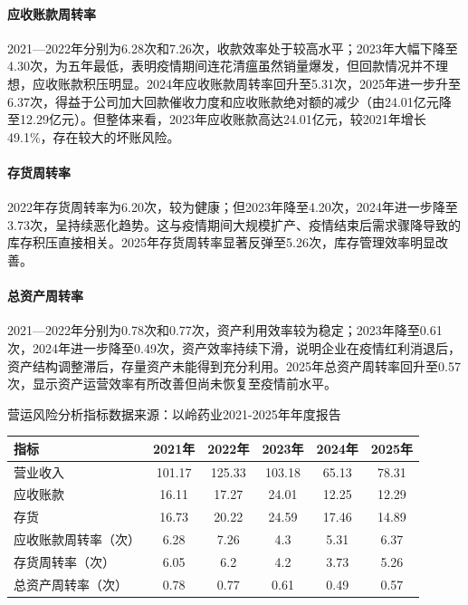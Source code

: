 \documentclass[12pt,a4paper,fontset=windows,UTF8]{ctexart}
\begin{document}
\paragraph*{应收账款周转率}
2021—2022年分别为6.28次和7.26次，收款效率处于较高水平；2023年大幅下降至4.30次，为五年最低，表明疫情期间连花清瘟虽然销量爆发，但回款情况并不理想，应收账款积压明显。2024年应收账款周转率回升至5.31次，2025年进一步升至6.37次，得益于公司加大回款催收力度和应收账款绝对额的减少（由24.01亿元降至12.29亿元）。但整体来看，2023年应收账款高达24.01亿元，较2021年增长49.1\%，存在较大的坏账风险。

\paragraph*{存货周转率}
2022年存货周转率为6.20次，较为健康；但2023年降至4.20次，2024年进一步降至3.73次，呈持续恶化趋势。这与疫情期间大规模扩产、疫情结束后需求骤降导致的库存积压直接相关。2025年存货周转率显著反弹至5.26次，库存管理效率明显改善。

\paragraph*{总资产周转率}
2021—2022年分别为0.78次和0.77次，资产利用效率较为稳定；2023年降至0.61次，2024年进一步降至0.49次，资产效率持续下滑，说明企业在疫情红利消退后，资产结构调整滞后，存量资产未能得到充分利用。2025年总资产周转率回升至0.57次，显示资产运营效率有所改善但尚未恢复至疫情前水平。

\begin{thesTab}[htbp]{营运风险分析指标\label{tab:t3}}{数据来源：以岭药业2021-2025年年度报告}
\begin{tabularx}{\linewidth}{X c c c c c}
  \toprule
  指标 & 2021年 & 2022年 & 2023年 & 2024年 & 2025年 \\
  \midrule
  营业收入 & 101.17 & 125.33 & 103.18 & 65.13 & 78.31 \\
  应收账款 & 16.11 & 17.27 & 24.01 & 12.25 & 12.29 \\
  存货 & 16.73 & 20.22 & 24.59 & 17.46 & 14.89 \\
  应收账款周转率（次） & 6.28 & 7.26 & 4.3 & 5.31 & 6.37 \\
  存货周转率（次） & 6.05 & 6.2 & 4.2 & 3.73 & 5.26 \\
  总资产周转率（次） & 0.78 & 0.77 & 0.61 & 0.49 & 0.57 \\
  \bottomrule
\end{tabularx}
\end{thesTab}
\end{document}

